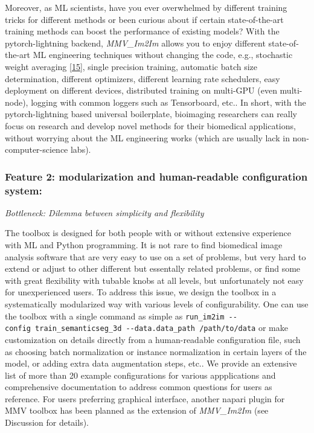 Moreover, as ML scientists, have you ever overwhelmed by different training tricks for different methods or been curious about if certain state-of-the-art training methods can boost the performance of existing models? With the pytorch-lightning backend, \emph{MMV\_Im2Im} allows you to enjoy different state-of-the-art ML engineering techniques without changing the code, e.g., stochastic weight averaging {[}\protect\hyperlink{ref-qzeQFRn9}{15}{]}, single precision training, automatic batch size determination, different optimizers, different learning rate schedulers, easy deployment on different devices, distributed training on multi-GPU (even multi-node), logging with common loggers such as Tensorboard, etc.. In short, with the pytorch-lightning based universal boilerplate, bioimaging researchers can really focus on research and develop novel methods for their biomedical applications, without worrying about the ML engineering works (which are usually lack in non-computer-science labs).

\hypertarget{feature-2-modularization-and-human-readable-configuration-system}{%
\subsubsection{Feature 2: modularization and human-readable configuration system:}\label{feature-2-modularization-and-human-readable-configuration-system}}

\emph{Bottleneck: Dilemma between simplicity and flexibility}

The toolbox is designed for both people with or without extensive experience with ML and Python programming. It is not rare to find biomedical image analysis software that are very easy to use on a set of problems, but very hard to extend or adjust to other different but essentally related problems, or find some with great flexibility with tubable knobs at all levels, but unfortunately not easy for unexperienced users. To address this issue, we design the toolbox in a systematically modularized way with various levels of configurability. One can use the toolbox with a single command as simple as \texttt{run\_im2im\ -\/-config\ train\_semanticseg\_3d\ -\/-data.data\_path\ /path/to/data} or make customization on details directly from a human-readable configuration file, such as choosing batch normalization or instance normalization in certain layers of the model, or adding extra data augmentation steps, etc.. We provide an extensive list of more than 20 example configurations for various appplications and comprehensive documentation to address common questions for users as reference. For users preferring graphical interface, another napari plugin for MMV toolbox has been planned as the extension of \emph{MMV\_Im2Im} (see Discussion for details).

